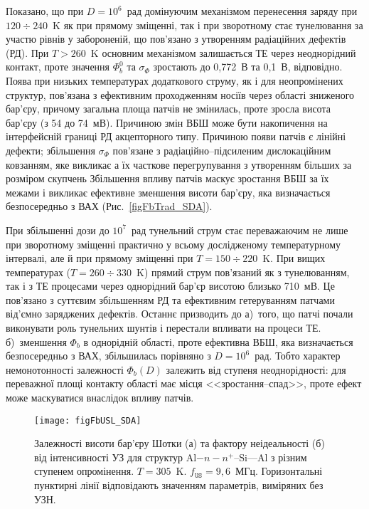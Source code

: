 \documentclass[a5paper,10pt,twoside,openany,article]{memoir} %
\begin{document}
Показано, що при $D=10^6$~рад домінуючим механізмом перенесення заряду при $120\div240$~K як при прямому зміщенні, так і при зворотному стає тунелювання за участю рівнів у забороненій, що пов'язано з утворенням радіаційних дефектів (РД).
При $T>260$~K основним механізмом залишається ТЕ через неоднорідний контакт, проте значення $\Phi_b^0$ та $\sigma_{\Phi}$
зростають до 0,772~В та 0,1~В, відповідно.
Поява при низьких температурах додаткового струму, як і для неопромінених структур, пов'язана з ефективним проходженням носіїв через області зниженого бар'єру,
причому загальна площа патчів не змінилась, проте зросла висота бар'єру (з 54 до 74~мВ).
Причиною змін ВБШ може бути накопичення на інтерфейсній границі РД акцепторного типу.
Причиною появи патчів є лінійні дефекти; збільшення $\sigma_{\Phi}$ пов'язане з  радіаційно--підсиленим дислокаційним ковзанням,
яке викликає а їх часткове перегрупування з утворенням більших за розміром скупчень
Збільшення впливу патчів маскує зростання ВБШ за їх межами і викликає ефективне зменшення висоти бар'єру, яка визначається безпосередньо з ВАХ (Рис.~\ref{figFbTrad_SDA}).

При збільшенні дози до $10^7$~рад тунельний струм стає переважаючим не лише при зворотному зміщенні практично у всьому дослідженому температурному інтервалі,
але й при прямому зміщенні при $T=150\div220$~K.
При вищих температурах ($T=260\div330$~K) прямий струм пов'язаний як з тунелюванням, так і з ТЕ процесами через однорідний бар'єр висотою близько 710~мВ.
Це пов'язано з суттєвим збільшенням РД та ефективним гетеруванням патчами від'ємно заряджених дефектів.
Останнє призводить до   
а)~того, що патчі почали виконувати роль тунельних шунтів і перестали впливати на процеси ТЕ.
б)~зменшення $\Phi_b$ в однорідній області, проте ефективна ВБШ, яка визначається безпосередньо з ВАХ, збільшилась порівняно з  $D=10^6$~рад.
Тобто характер немонотонності залежності $\Phi_b(D)$ залежить від ступеня неоднорідності:
для переважної площі контакту області має місця <<зростання--спад>>, проте ефект може маскуватися внаслідок впливу патчів.


\begin{figure}
\center
\texttt{[image: figFbUSL\_SDA]}
\caption{\label{figFbUSL_SDA}
Залежності висоти бар'єру Шотки (а) та фактору неідеальності (б)  від інтенсивності УЗ для
структур Al$-n-n^+$--Si---Al з різним ступенем опромінення.
$T=305$~K.
$f_\mathtt{US}=9,6$~МГц.
Горизонтальні пунктирні лінії відповідають значенням параметрів, виміряних без УЗН.
}%
\end{figure}
\end{document}
